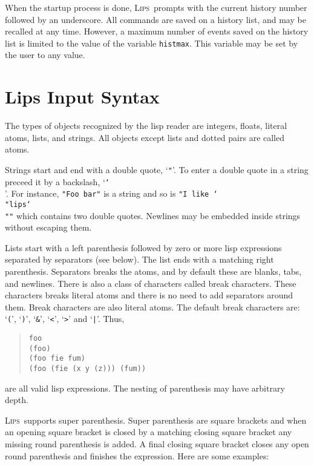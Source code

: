 \documentclass[a4paper]{article}
\newcommand{\lips}{\textsc{Lips}}
\newcommand{\lisp}[1]{\texttt{#1}}
\begin{document}
When the startup process is done, \lips\ prompts with the current
history number followed by an underscore.  All commands are saved on a
history list, and may be recalled at any time.  However, a maximum
number of events saved on the history list is limited to the value of
the variable \lisp{histmax}.  This variable may be set by the user to
any value.

\section{Lips Input Syntax}
The types of objects recognized by the lisp reader are integers,
floats, literal atoms, lists, and strings.  All objects except lists
and dotted pairs are called atoms.

Strings start and end with a double quote, `\lisp{"}'.  To enter a
double quote in a string preceed it by a backslash, `\lisp{\char`\\}'.
For instance, \lisp{"Foo bar"} is a string and so is \lisp{"I like
  \char`\\"lips\char`\\""} which contains two double quotes.  Newlines
may be embedded inside strings without escaping them.

Lists start with a left parenthesis followed by zero or more lisp
expressions separated by separators (see below).  The list ends with a
matching right parenthesis.  Separators breaks the atoms, and by
default these are blanks, tabs, and newlines.  There is also a class
of characters called break characters.  These characters breaks
literal atoms and there is no need to add separators around them.
Break characters are also literal atoms.  The default break characters
are: `\lisp{(}', `\lisp{)}', `\lisp{\&}', `\lisp{<}', `\lisp{>}' and
`\lisp{|}'.  Thus,

\begin{quote}
  \lisp{foo\\
    (foo)\\
    (foo fie fum)\\
    (foo (fie (x y (z))) (fum))}
\end{quote}

are all valid lisp expressions.  The nesting of parenthesis may have
arbitrary depth.

\lips\ supports super parenthesis. Super parenthesis are square
brackets and when an opening square bracket is closed by a matching
closing square bracket any missing round parenthesis is added. A final
closing square bracket closes any open round parenthesis and finishes
the expression. Here are some examples:
\end{document}
